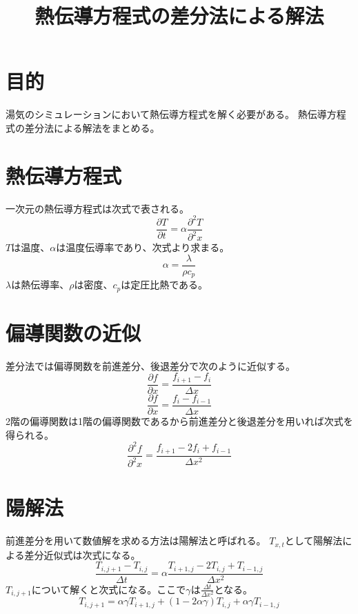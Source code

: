 \documentclass{ujarticle}
\title{熱伝導方程式の差分法による解法}
\begin{document}
\maketitle
\section{目的}
湯気のシミュレーションにおいて熱伝導方程式を解く必要がある。
熱伝導方程式の差分法による解法をまとめる。
\section{熱伝導方程式}
一次元の熱伝導方程式は次式で表される。
\begin{equation}
\frac{\partial T}{\partial t} = \alpha \frac{\partial^2T}{\partial^2x}
\end{equation}
$T$は温度、$\alpha$は温度伝導率であり、次式より求まる。
\begin{equation}
\alpha=\frac{\lambda}{\rho c_{p}}
\end{equation}
$\lambda$は熱伝導率、$\rho$は密度、$c_{p}$は定圧比熱である。
\section{偏導関数の近似}
差分法では偏導関数を前進差分、後退差分で次のように近似する。
\begin{equation}
\frac{\partial f}{\partial x}=\frac{f_{i+1}-f_{i}}{\Delta x}
\end{equation}
\begin{equation}
\frac{\partial f}{\partial x}=\frac{f_{i}-f_{i-1}}{\Delta x}
\end{equation}
2階の偏導関数は1階の偏導関数であるから前進差分と後退差分を用いれば次式を得られる。
\begin{equation}
\frac{\partial^2 f}{\partial^2 x} = \frac{f_{i+1}-2f_{i}+f_{i-1}}{\Delta x^2}
\end{equation}
\section{陽解法}
前進差分を用いて数値解を求める方法は陽解法と呼ばれる。
$T_{x,t}$として陽解法による差分近似式は次式になる。
\begin{equation}
\label{t_diff}
\frac{T_{i,j+1} - T_{i,j}}{\Delta t} = \alpha\frac{T_{i+1,j}-2T_{i,j}+T_{i-1,j}}{\Delta x^2}
	\end{equation}
$T_{i,j+1}$について解くと次式になる。ここで$\gamma$は$\frac{\Delta t}{\Delta x^2}$となる。
\begin{equation}
T_{i,j+1}=\alpha \gamma T_{i+1,j} + (1-2 \alpha \gamma)T_{i,j}+\alpha \gamma T_{i-1,j}
\end{equation}
\end{document}
